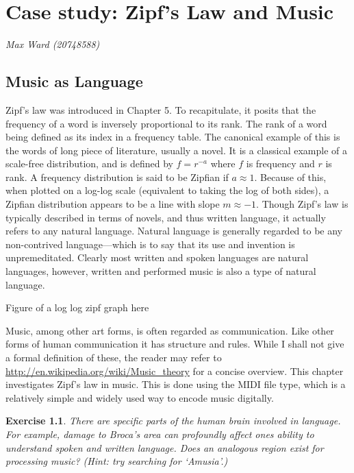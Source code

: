 \documentclass[10pt]{book}
\title{\thetitle}
\author{Allen B. Downey}
\newtheorem{exercise}{Exercise}[chapter]
\begin{document}
\chapter{Case study: Zipf's Law and Music}

{\em Max Ward (20748588)}

\section{Music as Language}

Zipf's law was introduced in Chapter 5. To recapitulate, it posits that the frequency of a word is inversely proportional to its rank. The rank of a word being defined as its index in a frequency table. The canonical example of this is the words of long piece of literature, usually a novel. It is a classical example of a scale-free distribution, and is defined by $f = r^{-a}$ where $f$ is frequency and $r$ is rank. A frequency distribution is said to be Zipfian if $a \approx 1$. Because of this, when plotted on a log-log scale (equivalent to taking the log of both sides), a Zipfian distribution appears to be a line with slope $m \approx -1$. Though Zipf's law is typically described in terms of novels, and thus written language, it actually refers to any natural language. Natural language is generally regarded to be any non-contrived language---which is to say that its use and invention is unpremeditated. Clearly most written and spoken languages are natural languages, however, written and performed music is also a type of natural language.

Figure of a log log zipf graph here

Music, among other art forms, is often regarded as communication. Like other forms of human communication it has structure and rules. While I shall not give a formal definition of these, the reader may refer to \url{http://en.wikipedia.org/wiki/Music_theory} for a concise overview. This chapter investigates Zipf's law in music. This is done using the MIDI file type, which is a relatively simple and widely used way to encode music digitally.


\begin{exercise}

There are specific parts of the human brain involved in language. For example, damage to Broca's area can profoundly affect ones ability to understand spoken and written language. Does an analogous region exist for processing music? (Hint: try searching for `Amusia'.)

\end{exercise}
\end{document}
